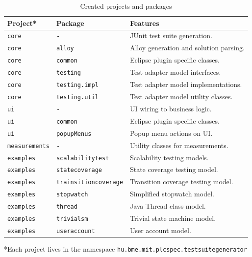 \begin{table}[htb]
\begin{center}
\begin{tabular}{p{3cm}p{4.5cm}p{6.5cm}}
\toprule
	\textbf{Project*} & \textbf{Package} & \textbf{Features}\\\midrule
	\texttt{core} & \texttt{-} & JUnit test suite generation.\\
	\texttt{core} & \texttt{alloy} & Alloy generation and solution parsing.\\
	\texttt{core} & \texttt{common} & Eclipse plugin specific classes.\\
	\texttt{core} & \texttt{testing} & Test adapter model interfaces.\\
	\texttt{core} & \texttt{testing.impl} & Test adapter model implementations.\\
	\texttt{core} & \texttt{testing.util} & Test adapter model utility classes.\\
	\texttt{ui} & \texttt{-} & UI wiring to business logic.\\
	\texttt{ui} & \texttt{common} & Eclipse plugin specific classes.\\
	\texttt{ui} & \texttt{popupMenus} & Popup menu actions on UI.\\
	\texttt{measurements} & \texttt{-} & Utility classes for measurements.\\
	\texttt{examples} & \texttt{scalabilitytest} & Scalability testing models.\\
	\texttt{examples} & \texttt{statecoverage} & State coverage testing model.\\
	\texttt{examples} & \texttt{trainsitioncoverage} & Transition coverage testing model.\\
	\texttt{examples} & \texttt{stopwatch} & Simplified stopwatch model.\\
	\texttt{examples} & \texttt{thread} & Java Thread class model.\\
	\texttt{examples} & \texttt{trivialsm} & Trivial state machine model.\\
	\texttt{examples} & \texttt{useraccount} & User account model.\\
\bottomrule
\end{tabular}
\end{center}
\begin{flushright}
\tiny{*Each project lives in the namespace \texttt{hu.bme.mit.plcspec.testsuitegenerator}}
\end{flushright}
\caption{\label{tab:hardwarespecification} Created projects and packages}
\end{table}

